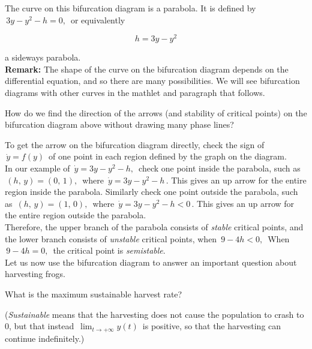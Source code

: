 The curve on this bifurcation diagram is a parabola.
It is defined by $\, 3y - y^2 - h = 0,\,$ or equivalently

\begin{equation*}
  h = 3y - y^2
\end{equation*}

a sideways parabola. \\

\textbf{Remark:} The shape of the curve on the bifurcation diagram depends on the differential equation,
and so there are many possibilities.
We will see bifurcation diagrams with other curves in the mathlet and paragraph that follows.

\begin{question}
  How do we find the direction of the arrows (and stability of critical points)
  on the bifurcation diagram above without drawing many phase lines?
\end{question}

To get the arrow on the bifurcation diagram directly,
check the sign of $\, \dot y = f(y)\,$ of one point in each region defined by the graph on the diagram. \\
In our example of $\, \dot y = 3y - y^2 -h,\,$ check one point inside the parabola,
such as $\, (h,\, y) = (0,\,1) ,\,$ where $\, \dot y = 3y - y^2 -h\,$.
This gives an up arrow for the entire region inside the parabola.
Similarly check one point outside the parabola, such as $\, (h,\, y) = (1,\, 0),\,$
where $\, \dot y = 3y - y^2 -h < 0\,$.
This gives an up arrow for the entire region outside the parabola.\\
Therefore, the upper branch of the parabola consists of \emph{\color{blue}stable} critical points,
and the lower branch consists of \emph{\color{orange}unstable} critical points,
when $\,9 - 4h<0,\,$ When $\, 9 - 4h = 0,\,$ the critical point is \emph{semistable}.\\

Let us now use the bifurcation diagram to answer an important question about harvesting frogs.

\begin{example}
  What is the maximum sustainable harvest rate?
\end{example}

(\emph{Sustainable} means that the harvesting does not cause the population to crash to $0$,
but that instead $\, \displaystyle \lim_{t \to + \infty} y(t) \,$ is positive,
so that the harvesting can continue indefinitely.) \\

